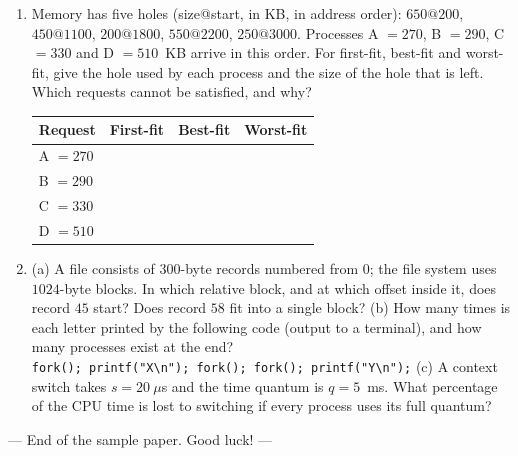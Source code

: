 \begin{enumerate}[leftmargin=2.0em,label=C\arabic*.,itemsep=0.5em]
  \newpage
  \item {} Memory has five holes (size@start, in KB, in address order): $650@200$, $450@1100$, $200@1800$, $550@2200$, $250@3000$. Processes A $= 270$, B $= 290$, C $= 330$ and D $= 510$~KB arrive in this order. For first-fit, best-fit and worst-fit, give the hole used by each process and the size of the hole that is left. Which requests cannot be satisfied, and why?
  \begin{center}
  \renewcommand{\arraystretch}{2.0}
  \begin{tabular}{|l|p{4.0cm}|p{4.0cm}|p{4.0cm}|}
  \hline
  \textbf{Request} & \textbf{First-fit} & \textbf{Best-fit} & \textbf{Worst-fit} \\ \hline
  A $= 270$ &&& \\ \hline
  B $= 290$ &&& \\ \hline
  C $= 330$ &&& \\ \hline
  D $= 510$ &&& \\ \hline
  \end{tabular}
  \end{center}
  \ans{2.0cm}

  \item {}
  (a) A file consists of $300$-byte records numbered from $0$; the file system uses $1024$-byte blocks. In which relative block, and at which offset inside it, does record $45$ start? Does record $58$ fit into a single block? 
  \ans{3.0cm}
  (b) How many times is each letter printed by the following code (output to a terminal), and how many processes exist at the end? \\
  \texttt{fork(); printf("X\textbackslash n"); fork(); fork(); printf("Y\textbackslash n");}
  \ans{2.2cm}
  (c) A context switch takes $s = 20\ \mu$s and the time quantum is $q = 5$~ms. What percentage of the CPU time is lost to switching if every process uses its full quantum? 
  \ans{2.0cm}
\end{enumerate}

\vfill
\begin{center}\small\color{muted}--- End of the sample paper. Good luck! ---\end{center}
